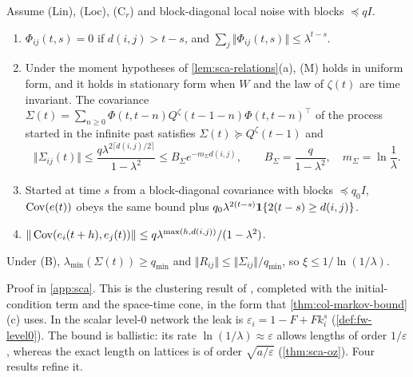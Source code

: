 \begin{theorem}\label{thm:sca-clustering}
Assume \textup{(Lin)}, \textup{(Loc)}, \textup{(C$_r$)} and block-diagonal local noise with blocks $\preceq qI$.
\begin{enumerate}
\item[(a)] $\Phi_{ij}(t,s)=0$ if $d(i,j)>t-s$, and $\sum_j\Vert\Phi_{ij}(t,s)\Vert\le\lambda^{t-s}$.
\item[(b)] Under the moment hypotheses of \cref{lem:sca-relations}(a), \textup{(M)} holds in uniform form, and it holds in stationary form when $W$ and the law of $\zeta(t)$ are time invariant. The covariance $\Sigma(t)=\sum_{n\ge0}\Phi(t,t-n)Q^\zeta(t-1-n)\Phi(t,t-n)^\top$ of the process started in the infinite past satisfies $\Sigma(t)\succeq Q^\zeta(t-1)$ and
\begin{equation}\label{eq:sca-clustering}
\Vert\Sigma_{ij}(t)\Vert\le\frac{q\lambda^{2\lceil d(i,j)/2\rceil}}{1-\lambda^2}\le B_\Sigma e^{-m_\Sigma d(i,j)},\qquad B_\Sigma=\frac q{1-\lambda^2},\quad m_\Sigma=\ln\frac1\lambda.
\end{equation}
\item[(c)] Started at time $s$ from a block-diagonal covariance with blocks $\preceq q_0I$, $\operatorname{Cov}(e(t))$ obeys the same bound plus $q_0\lambda^{2(t-s)}\mathbf{1}\{2(t-s)\ge d(i,j)\}$.
\item[(d)] $\Vert\operatorname{Cov}(e_i(t+h),e_j(t))\Vert\le q\lambda^{\max(h,d(i,j))}/(1-\lambda^2)$.
\end{enumerate}
Under \textup{(B)}, $\lambda_{\min}(\Sigma(t))\ge q_{\min}$ and $\Vert R_{ij}\Vert\le\Vert\Sigma_{ij}\Vert/q_{\min}$, so $\xi\le1/\ln(1/\lambda)$.
\end{theorem}
Proof in \cref{app:sca}. This is the clustering result of \citet{dennis2026communicating}, completed with the initial-condition term and the space-time cone, in the form that \cref{thm:col-markov-bound}(c) uses. In the scalar level-0 network the leak is $\varepsilon_i=1-F+Fk^s_i$ (\cref{def:fw-level0}). The bound is ballistic: its rate $\ln(1/\lambda)\approx\varepsilon$ allows lengths of order $1/\varepsilon$, whereas the exact length on lattices is of order $\sqrt{a/\varepsilon}$ (\cref{thm:sca-oz}). Four results refine it.

